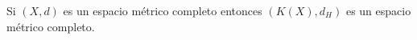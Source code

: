 \documentclass[FyPI.tex]{subfiles}
\begin{document}
\begin{theorem}
Si $(X,d)$ es un espacio métrico completo entonces $(K(X),d_H)$ es un espacio métrico completo.
\end{theorem}
\end{document}
